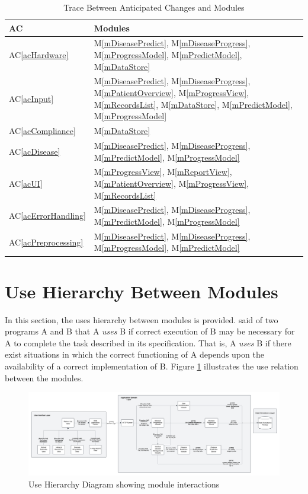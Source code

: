 \documentclass[12pt, titlepage]{article}
\newcommand{\acref}[1]{AC\ref{#1}}
\newcommand{\mref}[1]{M\ref{#1}}
\begin{document}
\begin{table}[H]
\centering
\begin{tabular}{p{} p{}}
\toprule
\textbf{AC} & \textbf{Modules}\\
\midrule
\acref{acHardware} & \mref{mDiseasePredict}, \mref{mDiseaseProgress}, \mref{mProgressModel}, \mref{mPredictModel}, \mref{mDataStore}\\
\acref{acInput} & \mref{mDiseasePredict}, \mref{mDiseaseProgress}, \mref{mPatientOverview}, \mref{mProgressView}, \mref{mRecordsList}, \mref{mDataStore}, \mref{mPredictModel}, \mref{mProgressModel}\\
\acref{acCompliance} & \mref{mDataStore}\\
\acref{acDisease} & \mref{mDiseasePredict}, \mref{mDiseaseProgress}, \mref{mPredictModel}, \mref{mProgressModel}\\
\acref{acUI} & \mref{mProgressView}, \mref{mReportView}, \mref{mPatientOverview}, \mref{mProgressView}, \mref{mRecordsList}\\
\acref{acErrorHandling} & \mref{mDiseasePredict}, \mref{mDiseaseProgress}, \mref{mPredictModel}, \mref{mProgressModel}\\
\acref{acPreprocessing} & \mref{mDiseasePredict}, \mref{mDiseaseProgress}, \mref{mProgressModel}, \mref{mPredictModel}\\
\bottomrule
\end{tabular}
\caption{Trace Between Anticipated Changes and Modules}
\label{TblACT}
\end{table}

\section{Use Hierarchy Between Modules} \label{SecUse}

In this section, the uses hierarchy between modules is provided. \citet{Parnas1978} said of two programs A and B that A {\em uses} B if correct execution of B may be necessary for A to complete the task described in its specification. That is, A {\em uses} B if there exist situations in which the correct functioning of A depends upon the availability of a correct implementation of B. Figure \ref{FigUH} illustrates the use relation between the modules.

\begin{figure}[H]
\centering
\includegraphics[width=1.1\textwidth]{../../assets/ContextDesignFlow.png}
\caption{Use Hierarchy Diagram showing module interactions}
\label{FigUH}
\end{figure}
\end{document}
